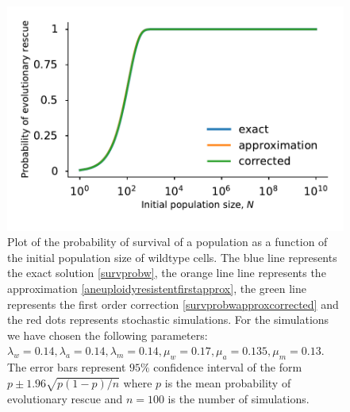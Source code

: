 \documentclass[12pt]{extarticle}
\begin{document}
\begin{figure}[!h]
 \vspace*{1\baselineskip}
\includegraphics[width=1\textwidth]{Figures/SurvPlotNData.pdf}
\caption{Plot of the probability of survival of a population as a function of the initial population size of wildtype cells. The blue line represents the exact solution \eqref{survprobw}, the orange line line represents the approximation \eqref{aneuploidyresistentfirstapprox}, the green line represents the first order correction \eqref{survprobwapproxcorrected} and the red dots represents stochastic simulations. For the simulations we have chosen the following parameters: $\lambda_w=0.14, \lambda_a=0.14,\lambda_m=0.14,\mu_w=0.17,\mu_a=0.135,\mu_m=0.13$. The error bars represent $95\%$ confidence interval of the form $p\pm1.96\sqrt{p\left(1-p\right)/n}$ where $p$ is the mean probability of evolutionary rescue and $n=100$ is the number of simulations.}
\label{SurvPlotNData}
\end{figure}
\end{document}
